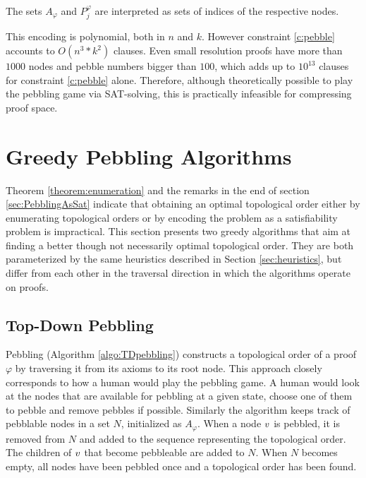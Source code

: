 \documentclass{llncs}
\newcommand{\Premises}[2]{P_{#1}^{#2}}
\newcommand{\Axioms}[1]{A_{#1}}
\begin{document}
The sets $\Axioms{\varphi}$ and $\Premises{j}{\varphi}$ are interpreted as sets of indices of the respective nodes.

\noindent
This encoding is polynomial, both in $n$ and $k$. However constraint \ref{c:pebble} accounts to $O(n^3*k^2)$ clauses. Even small resolution proofs have more than $1000$ nodes and pebble numbers bigger than $100$, which adds up to $10^{13}$ clauses for constraint \ref{c:pebble} alone. Therefore, although theoretically possible to play the pebbling game via SAT-solving, this is practically infeasible for compressing proof space.


\section{Greedy Pebbling Algorithms}
\label{sec:algorithms}

Theorem \ref{theorem:enumeration} and the remarks in the end of section \ref{sec:PebblingAsSat} indicate that obtaining an optimal topological order either by enumerating topological orders or by encoding the problem as a satisfiability problem is impractical. This section presents two greedy algorithms that aim at finding a better though not necessarily optimal topological order. They are both parameterized by the same heuristics described in Section \ref{sec:heuristics}, but differ from each other in the traversal direction in which the algorithms operate on proofs.

\subsection{Top-Down Pebbling}

 Pebbling (Algorithm \ref{algo:TDpebbling}) constructs a topological order of a proof $\varphi$ by traversing it from its axioms to its root node.
This approach closely corresponds to how a human would play the pebbling game. 
A human would look at the nodes that are available for pebbling at a given state, choose one of them to pebble and remove pebbles if possible.
Similarly the algorithm keeps track of pebblable nodes in a set $N$, initialized as $\Axioms{\varphi}$.
When a node $v$ is pebbled, it is removed from $N$ and added to the sequence representing the topological order. The children of $v$ that become pebbleable are added to $N$.
When $N$ becomes empty, all nodes have been pebbled once and a topological order has been found.
\end{document}
